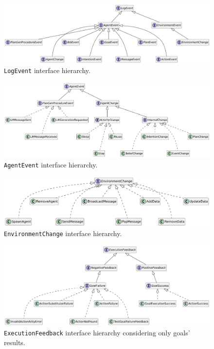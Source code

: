 \documentclass[12pt,a4paper,openright,twoside]{book}
\begin{document}
\begin{figure}
    \centering
    \includegraphics[width=\textwidth]{figures/log-event.pdf}
    \caption{\texttt{LogEvent} interface hierarchy.}
    \label{fig:jakta-log-event}
\end{figure}

\begin{figure}
    \centering
    \includegraphics[width=\textwidth]{figures/agent-event.pdf}
    \caption{\texttt{AgentEvent} interface hierarchy.}
    \label{fig:agent-event}
\end{figure}

\begin{figure}
    \centering
    \includegraphics[width=\textwidth]{figures/environment-change.pdf}
    \caption{\texttt{EnvironmentChange} interface hierarchy.}
    \label{fig:environment-change}
\end{figure}

\begin{figure}
    \centering
    \includegraphics[width=\textwidth]{figures/execution-feedback.pdf}
    \caption{\texttt{ExecutionFeedback} interface hierarchy considering only goals' results.}
    \label{fig:execution-feedback-goals}
\end{figure}
\end{document}
